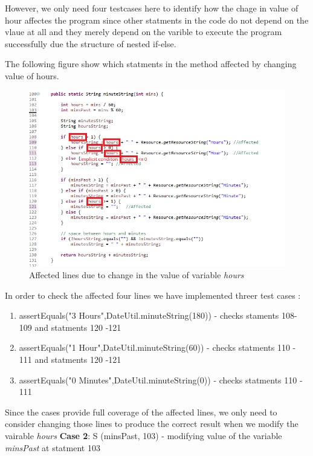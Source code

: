\documentclass[fontsize=12pt,paper=letter,twoside]{scrartcl}
\begin{document}
However, we only need four testcases here to identify how the chage in value of hour affectes the program since other statments in the code do not depend on the vlaue at all and they merely depend on the varible to execute the program successfully due the structure of nested if-else.
 
The following figure show which statments in the method affected by changing value of hours. 
 \begin{figure}[!htb]
\begin{center}
\includegraphics[width=.99\textwidth]{images/forward/hour.png}
\end{center}
\caption{Affected lines due to change in the value of  variable \emph{hours}}
\label{fig:minuteStringCode}
\end{figure}
\newline
\newline
\newline
\newline
In order to check the affected four lines we have implemented threer test cases :
\begin{enumerate}
\item assertEquals("3 Hours",DateUtil.minuteString(180))  - checks staments 108- 109 and statments 120 -121
\item assertEquals("1 Hour",DateUtil.minuteString(60))  - checks statments 110 - 111 and statments 120 -121
\item assertEquals("0 Minutes",DateUtil.minuteString(0)) - checks statments 110 - 111
\end{enumerate}

Since the cases provide full coverage of the affected lines, we only need to consider changing those lines to produce the correct result when we modify the vairable \emph{hours}
\newline
\newline
\textbf {Case 2}: S (minsPast, 103) -  modifying value of  the variable \emph{minsPast} at statment 103
\end{document}
